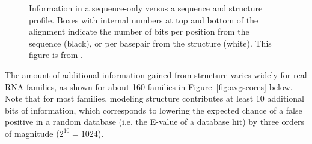 \documentclass[custom,landscape,final,30pt,plainboxedsections]{sciposter-titleskipsmall}
\begin{document}
\begin{multicols}{3}
\begin{footnotesize}
\begin{figure}
\caption{Information in a sequence-only versus a sequence and
  structure profile. 
  Boxes with internal numbers at top and bottom of
  the alignment indicate the number of bits per position from the
  sequence (black), or per basepair from the structure (white).
  This figure is from \cite{Nawrocki13}.
}
\label{fig:seqstructprofiles}
\end{figure}
\end{footnotesize}

The amount of additional information gained from structure varies
widely for real RNA families, as shown for about 160 families in
Figure~\ref{fig:avgscores} below. 
Note that for most families, modeling structure
contributes at least 10 additional bits of information, which
corresponds to lowering the expected chance of a false positive in a
random database (i.e. the E-value of a database hit) by three orders
of magnitude ($2^{10} = 1024$).


\end{multicols}
\end{document}
